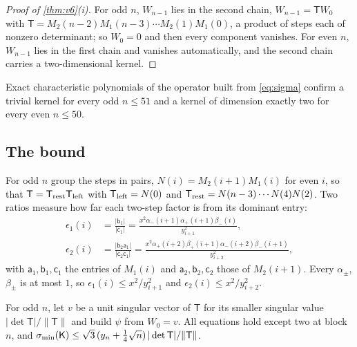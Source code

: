 \begin{proof}[Proof of \cref{thm:v6}(i)]
For odd $n$, $W_{n-1}$ lies in the second chain, $W_{n-1}=\mathsf TW_0$ with
$\mathsf T=M_2(n-2)M_1(n-3)\cdots M_2(1)M_1(0)$, a product of steps each of nonzero
determinant; so $W_0=0$ and then every component vanishes. For even $n$, $W_{n-1}$ lies
in the first chain and vanishes automatically, and the second chain carries a
two-dimensional kernel.
\end{proof}

Exact characteristic polynomials of the operator built from \eqref{eq:sigma} confirm a trivial kernel for every odd
$n\le51$ and a kernel of dimension exactly two for every even $n\le50$.

\subsection{The bound}

For odd $n$ group the steps in pairs, $N(i)=M_2(i+1)M_1(i)$ for even $i$, so that
$\mathsf T=\mathsf T_{\rm rest}\mathsf T_{\rm left}$ with $\mathsf T_{\rm left}=N(0)$ and
$\mathsf T_{\rm rest}=N(n-3)\cdots N(4)N(2)$. Two ratios measure how far each two-step
factor is from its dominant entry:
\begin{align*}
  \epsilon_1(i)&=\frac{|\mathsf b_1|}{|\mathsf c_1|}=\frac{x^2\alpha_-(i+1)\alpha_+(i+1)\beta_-(i)}{y_{i+1}^2},\\
  \epsilon_2(i)&=\frac{|\mathsf b_2\mathsf a_1|}{|\mathsf c_2\mathsf c_1|}
  =\frac{x^2\alpha_+(i+2)\beta_+(i+1)\alpha_-(i+2)\beta_-(i+1)}{y_{i+2}^2},
\end{align*}
with $\mathsf a_1,\mathsf b_1,\mathsf c_1$ the entries of $M_1(i)$ and
$\mathsf a_2,\mathsf b_2,\mathsf c_2$ those of $M_2(i+1)$. Every $\alpha_\pm$, $\beta_\pm$ is at
most $1$, so $\epsilon_1(i)\le x^2/y_{i+1}^2$ and $\epsilon_2(i)\le x^2/y_{i+2}^2$.

\begin{lemma}[Quasimode]\label{lem:quasimode}
For odd $n$, let $v$ be a unit singular vector of $\mathsf T$ for its smaller singular value
$|\det\mathsf T|/\|\mathsf T\|$ and build $\psi$ from $W_0=v$. All equations hold except two at block
$n$, and $\sigma_{\min}(\mathsf K)\le\sqrt3\,(y_n+\frac14\sqrt n)\,|\det\mathsf T|/\|\mathsf T\|$.
\end{lemma}

